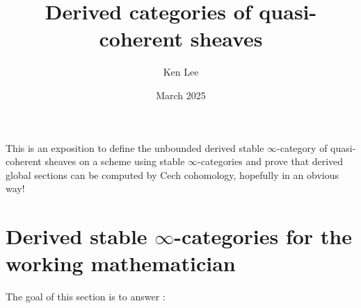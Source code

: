 \documentclass{article}
\begin{document}
\title{Derived categories of quasi-coherent sheaves}

\author{Ken Lee}
\date{March 2025}
\maketitle

This is an exposition to
define the unbounded derived stable $\infty$-category of quasi-coherent sheaves
on a scheme using stable $\infty$-categories and
prove that derived global sections can be computed by Cech cohomology,
hopefully in an obvious way!

\section{Derived stable $\infty$-categories for the working mathematician}

The goal of this section is to answer :
\begin{center}
\end{center}

\end{document}
